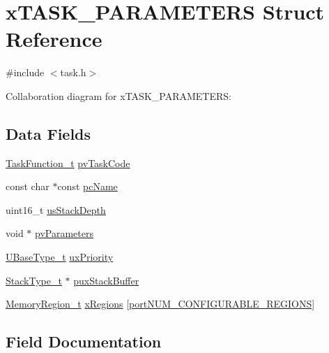 \hypertarget{structx_t_a_s_k___p_a_r_a_m_e_t_e_r_s}{}\section{x\+T\+A\+S\+K\+\_\+\+P\+A\+R\+A\+M\+E\+T\+E\+RS Struct Reference}
\label{structx_t_a_s_k___p_a_r_a_m_e_t_e_r_s}


{\ttfamily \#include $<$task.\+h$>$}



Collaboration diagram for x\+T\+A\+S\+K\+\_\+\+P\+A\+R\+A\+M\+E\+T\+E\+RS\+:
\subsection*{Data Fields}
\begin{DoxyCompactItemize}
\item 
\hyperlink{projdefs_8h_a9b32502ff92c255c686dacde53c1cba0}{Task\+Function\+\_\+t} \hyperlink{structx_t_a_s_k___p_a_r_a_m_e_t_e_r_s_a06aee8b42bc6c569b62ab3cdc4abf8b0}{pv\+Task\+Code}
\item 
const char $\ast$const \hyperlink{structx_t_a_s_k___p_a_r_a_m_e_t_e_r_s_a2de8afaf668518af9982627791b2cc23}{pc\+Name}
\item 
uint16\+\_\+t \hyperlink{structx_t_a_s_k___p_a_r_a_m_e_t_e_r_s_aae6fa1f3cc5f8b931225ed4b454f3865}{us\+Stack\+Depth}
\item 
void $\ast$ \hyperlink{structx_t_a_s_k___p_a_r_a_m_e_t_e_r_s_a308cef200968d514395c0272c061d3ec}{pv\+Parameters}
\item 
\hyperlink{portmacro_8h_a646f89d4298e4f5afd522202b11cb2e6}{U\+Base\+Type\+\_\+t} \hyperlink{structx_t_a_s_k___p_a_r_a_m_e_t_e_r_s_a0befed3dd0fe55b4314158f4814f50ae}{ux\+Priority}
\item 
\hyperlink{portmacro_8h_a84e9a8ba132feed0b2401c1f4e2ac63c}{Stack\+Type\+\_\+t} $\ast$ \hyperlink{structx_t_a_s_k___p_a_r_a_m_e_t_e_r_s_a3f80c2175bac00298ba9a17ddd50e29d}{pux\+Stack\+Buffer}
\item 
\hyperlink{task_8h_af609504de4d78ff6f71477ae47c66e51}{Memory\+Region\+\_\+t} \hyperlink{structx_t_a_s_k___p_a_r_a_m_e_t_e_r_s_a7bc9c069ce3a5e929c7ef29e95184584}{x\+Regions} \mbox{[}\hyperlink{portable_8h_aca7e1a8a568a38b74cc9db10c8efebda}{port\+N\+U\+M\+\_\+\+C\+O\+N\+F\+I\+G\+U\+R\+A\+B\+L\+E\+\_\+\+R\+E\+G\+I\+O\+NS}\mbox{]}
\end{DoxyCompactItemize}


\subsection{Field Documentation}
\mbox{\label{structx_t_a_s_k___p_a_r_a_m_e_t_e_r_s_a2de8afaf668518af9982627791b2cc23}} 
